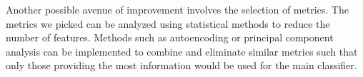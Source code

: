 \documentclass[a4paper, 11pt]{article}
\begin{document}

Another possible avenue of improvement involves the selection of metrics. The metrics we picked can be analyzed using statistical methods to reduce the number of features. Methods such as autoencoding or principal component analysis can be implemented to combine and eliminate similar metrics such that only those providing the most information would be used for the main classifier. %


    
\end{document}
